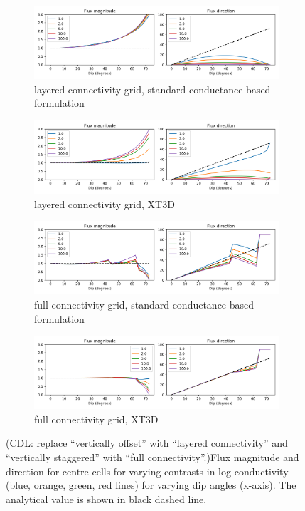 \documentclass{article}
\begin{document}
\begin{figure}[p!]
\centering
\begin{subfigure}{0.9\textwidth}
	\includegraphics[width=\textwidth]{../figures/fig4_0_paper.png}
	\caption{layered connectivity grid, standard conductance-based formulation}
	\label{fig:fig4a}
\end{subfigure}
\begin{subfigure}{0.9\textwidth}
	\includegraphics[width=\textwidth]{../figures/fig4_1_paper.png}
	\caption{layered connectivity grid, XT3D}
	\label{fig:fig4b}
\end{subfigure}
\begin{subfigure}{0.9\textwidth}
	\includegraphics[width=\textwidth]{../figures/fig4_2_paper.png}
	\caption{full connectivity grid, standard conductance-based formulation}
	\label{fig:fig4c}
\end{subfigure}
\begin{subfigure}{0.9\textwidth}
	\includegraphics[width=\textwidth]{../figures/fig4_3_paper.png}
	\caption{full connectivity grid, XT3D}
	\label{fig:fig4d}
\end{subfigure}

\caption{{\color{red} (CDL: replace ``vertically offset'' with ``layered connectivity'' and ``vertically staggered'' with ``full connectivity''.)}Flux magnitude and direction for centre cells for varying contrasts in log conductivity (blue, orange, green, red lines) for varying dip angles (x-axis). The analytical value is shown in black dashed line.}
\label{fig:figures}
\end{figure}
\end{document}
